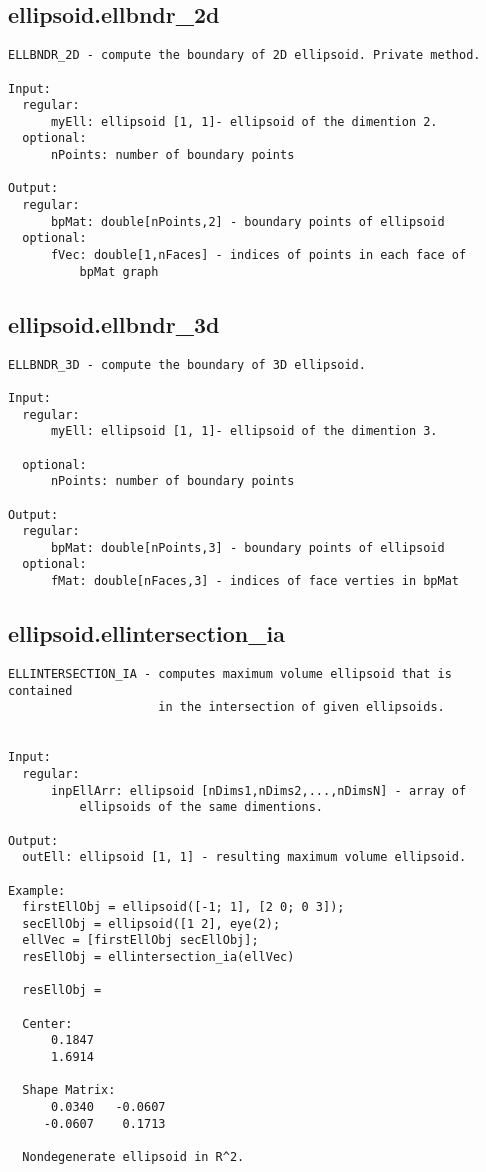 \subsection{\texorpdfstring{ellipsoid.ellbndr\_2d}{ellbndr\_2d}}\label{method:ellipsoid.ellbndr2d}
\begin{verbatim}
ELLBNDR_2D - compute the boundary of 2D ellipsoid. Private method.

Input:
  regular:
      myEll: ellipsoid [1, 1]- ellipsoid of the dimention 2.
  optional:
      nPoints: number of boundary points

Output:
  regular:
      bpMat: double[nPoints,2] - boundary points of ellipsoid
  optional:
      fVec: double[1,nFaces] - indices of points in each face of
          bpMat graph
\end{verbatim}
\subsection{\texorpdfstring{ellipsoid.ellbndr\_3d}{ellbndr\_3d}}\label{method:ellipsoid.ellbndr3d}
\begin{verbatim}
ELLBNDR_3D - compute the boundary of 3D ellipsoid.

Input:
  regular:
      myEll: ellipsoid [1, 1]- ellipsoid of the dimention 3.

  optional:
      nPoints: number of boundary points

Output:
  regular:
      bpMat: double[nPoints,3] - boundary points of ellipsoid
  optional:
      fMat: double[nFaces,3] - indices of face verties in bpMat
\end{verbatim}
\subsection{\texorpdfstring{ellipsoid.ellintersection\_ia}{ellintersection\_ia}}\label{method:ellipsoid.ellintersectionia}
\begin{verbatim}
ELLINTERSECTION_IA - computes maximum volume ellipsoid that is contained
                     in the intersection of given ellipsoids.


Input:
  regular:
      inpEllArr: ellipsoid [nDims1,nDims2,...,nDimsN] - array of
          ellipsoids of the same dimentions.

Output:
  outEll: ellipsoid [1, 1] - resulting maximum volume ellipsoid.

Example:
  firstEllObj = ellipsoid([-1; 1], [2 0; 0 3]);
  secEllObj = ellipsoid([1 2], eye(2);
  ellVec = [firstEllObj secEllObj];
  resEllObj = ellintersection_ia(ellVec)

  resEllObj =

  Center:
      0.1847
      1.6914

  Shape Matrix:
      0.0340   -0.0607
     -0.0607    0.1713

  Nondegenerate ellipsoid in R^2.
\end{verbatim}
